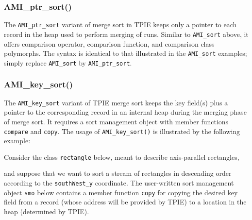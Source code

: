 
\subsubsection{AMI\_ptr\_sort()}

The \lstinline|AMI_ptr_sort| variant of merge sort in TPIE
keeps only a pointer to each record in the heap used to
perform merging of runs. Similar to \lstinline|AMI_sort|
above, it offers comparison
operator, comparison function, and comparison class
polymorphs. The syntax is identical to that illustrated in
the \lstinline|AMI_sort| examples; simply replace
\lstinline|AMI_sort| by \lstinline|AMI_ptr_sort|.

\subsubsection{AMI\_key\_sort()}

The \lstinline|AMI_key_sort| variant of TPIE merge sort keeps
the key field(s) plus a pointer to the corresponding record
in an internal heap during the merging phase of merge sort.
It requires a sort management object with member functions
\lstinline|compare| and \lstinline|copy|. The usage of
\lstinline|AMI_key_sort()| is illustrated by the following
example:


Consider the class \lstinline|rectangle| below, meant to
describe axis-parallel rectangles,




\noindent
and suppose that we want to sort a stream of rectangles in
descending order according to the \lstinline|southWest_y|
coordinate. The user-written sort management object
\lstinline|smo| below contains a member function \lstinline|copy|
for copying the desired key field from a record (whose
address will be provided by TPIE) to a location in the heap
(determined by TPIE). 

